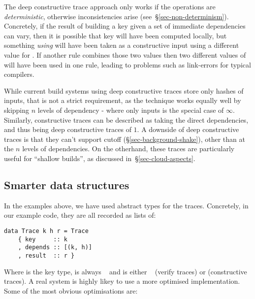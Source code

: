 The deep constructive trace approach only works if the operations are \emph{deterministic}, otherwise inconsistencies arise (see~\S\ref{sec-non-determinism}). Concretely, if the result of building a key given a set of immediate dependencies can vary, then it is possible that key  will have been computed locally, but something \emph{using}  will have been taken as a constructive input using a different value for . If another rule combines those two values then two different values of  will have been used in one rule, leading to problems such as link-errors for typical compilers.

While current build systems using deep constructive traces store only hashes of inputs, that is not a strict requirement, as the technique works equally well by skipping $n$ levels of dependency - where only inputs is the special case of $\infty$. Similarly, constructive traces can be described as taking the direct dependencies, and thus being deep constructive traces of $1$. A downside of deep constructive traces is that they can't support cutoff (\S\ref{sec-background-shake}), other than at the $n$ levels of dependencies. On the otherhand, these traces are particularly useful for ``shallow builds'', as discussed in~\S\ref{sec-cloud-aspects}.

\subsection{Smarter \hs{[Trace]} data structures}\label{sec-smart-traces}

In the examples above, we have used abstract types for the traces. Concretely, in our example code, they are all recorded as lists of:

\begin{verbatim}
data Trace k h r = Trace
    { key     :: k
    , depends :: [(k, h)]
    , result  :: r }
\end{verbatim}

Where  is the key type,  is always ~ and  is either ~ (verify traces) or  (constructive traces). A real system is highly likey to use a more optimised implementation. Some of the most obvious optimisations are:

